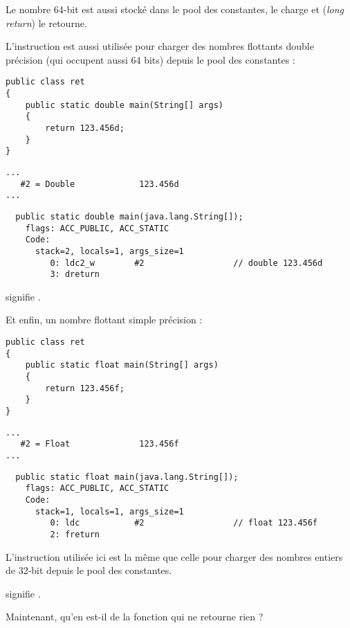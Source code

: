 Le nombre 64-bit est aussi stocké dans le pool des constantes,  le charge et 
(\emph{long return}) le retourne.

L'instruction  est aussi utilisée pour charger des nombres flottants double précision
(qui occupent aussi 64 bits) depuis le pool des constantes :

\begin{lstlisting}[style=customjava]
public class ret
{
	public static double main(String[] args)
	{
		return 123.456d;
	}
}
\end{lstlisting}

\begin{lstlisting}[caption=Constant pool]
...
   #2 = Double             123.456d
...
\end{lstlisting}

\begin{lstlisting}
  public static double main(java.lang.String[]);
    flags: ACC_PUBLIC, ACC_STATIC
    Code:
      stack=2, locals=1, args_size=1
         0: ldc2_w        #2                  // double 123.456d
         3: dreturn
\end{lstlisting}

 signifie .

Et enfin, un nombre flottant simple précision :

\begin{lstlisting}[style=customjava]
public class ret
{
	public static float main(String[] args)
	{
		return 123.456f;
	}
}
\end{lstlisting}

\begin{lstlisting}[caption=Constant pool]
...
   #2 = Float              123.456f
...
\end{lstlisting}

\begin{lstlisting}
  public static float main(java.lang.String[]);
    flags: ACC_PUBLIC, ACC_STATIC
    Code:
      stack=1, locals=1, args_size=1
         0: ldc           #2                  // float 123.456f
         2: freturn
\end{lstlisting}

L'instruction  utilisée ici est la même que celle pour charger des nombres entiers de 32-bit
depuis le pool des constantes.

 signifie .

Maintenant, qu'en est-il de la fonction qui ne retourne rien ?

